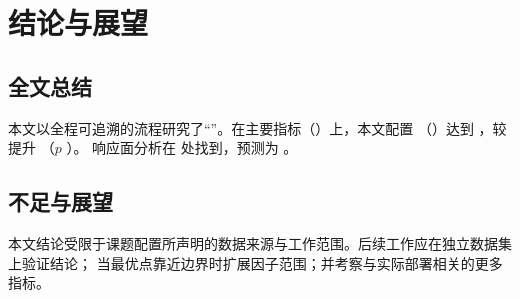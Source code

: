 \chapter{结论与展望}
\label{chap:conclusion}

\section{全文总结}
本文以全程可追溯的流程研究了“\ThesisTitle”。在主要指标（\MetricPrimaryName）上，本文配置
（\MetricPrimaryProposedName）达到 \MetricPrimaryProposedMean{} \MetricPrimaryUnit，较
\MetricPrimaryRunnerUpName{} 提升 \DiffPrimaryAbs（$p$ \StatPrimaryPval）。
\ifAutoHasRsm
响应面分析在 \StatRsmPrimaryOptPoint{} 处找到\StatRsmPrimaryOptNature，预测\MetricPrimaryName{}为
\StatRsmPrimaryOptResponse。
\fi

\section{不足与展望}
本文结论受限于课题配置所声明的数据来源与工作范围。后续工作应在独立数据集上验证结论；
当最优点靠近边界时扩展因子范围；并考察与实际部署相关的更多指标。
